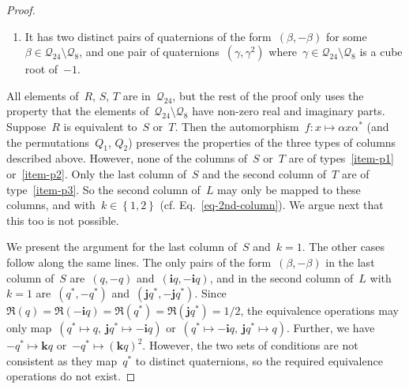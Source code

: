 \documentclass[12pt]{article}
\numberwithin{equation}{section}
\newcommand{\qi}{\mathbf{i}}
\newcommand{\qj}{\mathbf{j}}
\newcommand{\qk}{\mathbf{k}}
\newcommand{\Q}{\mathcal{Q}}
\newcommand{\set}[1]{\left\{ #1 \right\}}
\begin{document}
\begin{proof}
\begin{enumerate}
\item \label{item-p3}
It has two distinct pairs of quaternions of the form~$(\beta, -\beta)$ for some~$\beta \in \Q_{24} \setminus \Q_8$, and one pair of quaternions~$(\gamma, \gamma^2)$ where~$\gamma \in \Q_{24} \setminus \Q_8$ is a cube root of~$-1$. 

\end{enumerate}

All elements of~$R$, $S$, $T$ are in~$\Q_{24}$, but the rest of the proof only uses the property that the elements of~$ \Q_{24} \setminus \Q_8$ have non-zero real and imaginary parts. Suppose~$R$ is equivalent to~$S$ or~$T$. Then the automorphism~$f \colon x \mapsto \alpha x \alpha^* $ (and the permutations~$Q_1$, $Q_2$) preserves the properties of the three types of columns described above. However, none of the columns of~$S$ or~$T$ are of types~\ref{item-p1} or~\ref{item-p2}. Only the last column of~$S$ and the second column of~$T$ are of type~\ref{item-p3}. So the second column of~$L$ may only be mapped to these columns, and with~$k \in \set{1,2}$ (cf. Eq.~\eqref{eq-2nd-column}). We argue next that this too is not possible.

We present the argument for the last column of~$S$ and~$k = 1$. The other cases follow along the same lines.
The only pairs of the form~$(\beta, -\beta)$ in the last column of~$S$ are~$(q,-q)$ and~$(\qi q, -\qi q)$, and in the second column of~$L$ with~$k = 1$ are~$(q^*, -q^*)$ and~$(\qj q^*, -\qj q^*)$. Since~$\Re(q) = \Re(-\qi q) = \Re(q^*) = \Re(\qj q^*) = 1/2$, the equivalence operations may only map~$(q^* \mapsto q, ~ \qj q^* \mapsto -\qi q)$ or~$(q^* \mapsto -\qi q, ~ \qj q^* \mapsto q)$. Further, we have~$-q^* \mapsto \qk q$ or~$-q^* \mapsto (\qk q)^2$. However, the two sets of conditions are not consistent as they map~$q^*$ to distinct quaternions, so the required equivalence operations do not exist.
\end{proof}
\end{document}
